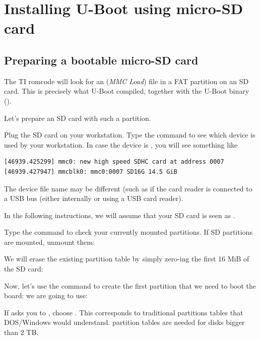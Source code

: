 
\section{Installing U-Boot using micro-SD card}

\subsection{Preparing a bootable micro-SD card}

The TI romcode will look for an  ({\em MMC Load})
file in a FAT partition on an SD card. This is precisely what U-Boot
compiled, together with the U-Boot binary ().

Let's prepare an SD card with such a partition.

Plug the SD card on your workstation. Type the  command
to see which device is used by your workstation. In case the device is
, you will see something like

\begin{verbatim}
[46939.425299] mmc0: new high speed SDHC card at address 0007
[46939.427947] mmcblk0: mmc0:0007 SD16G 14.5 GiB
\end{verbatim}

The device file name may be different (such as 
if the card reader is connected to a USB bus (either internally
or using a USB card reader).

In the following instructions, we will assume that your SD card is
seen as .

Type the  command to check your currently mounted
partitions. If SD partitions are mounted, unmount them:


We will erase the existing partition table by simply zero-ing the
first 16 MiB of the SD card:


Now, let's use the  command to create the first partition
that we need to boot the board:
we are going to use:


If  asks you to , choose
. This corresponds to traditional partitions tables that DOS/Windows
would understand.  partition tables are needed for disks bigger
than 2 TB.

